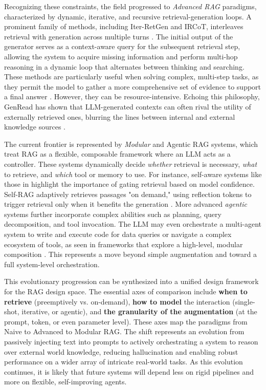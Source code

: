 \documentclass[11pt,a4paper]{article}
\begin{document}
Recognizing these constraints, the field progressed to \emph{Advanced RAG} paradigms, characterized by dynamic, iterative, and recursive retrieval-generation loops. A prominent family of methods, including Iter-RetGen and IRCoT, interleaves retrieval with generation across multiple turns \cite{arxiv:2305.15294v2}. The initial output of the generator serves as a context-aware query for the subsequent retrieval step, allowing the system to acquire missing information and perform multi-hop reasoning in a dynamic loop that alternates between thinking and searching. These methods are particularly useful when solving complex, multi-step tasks, as they permit the model to gather a more comprehensive set of evidence to support a final answer \cite{arxiv:2305.15294v2}. However, they can be resource-intensive. Echoing this philosophy, GenRead has shown that LLM-generated contexts can often rival the utility of externally retrieved ones, blurring the lines between internal and external knowledge sources \cite{arxiv:2209.10063v3}.

The current frontier is represented by \emph{Modular} and Agentic RAG systems, which treat RAG as a flexible, composable framework where an LLM acts as a controller. These systems dynamically decide \emph{whether} retrieval is necessary, \emph{what} to retrieve, and \emph{which} tool or memory to use. For instance, self-aware systems like those in \cite{arxiv:2212.10511v4} highlight the importance of gating retrieval based on model confidence. Self-RAG adaptively retrieves passages "on demand," using reflection tokens to trigger retrieval only when it benefits the generation \cite{arxiv:2310.11511v1}. More advanced \emph{agentic} systems further incorporate complex abilities such as planning, query decomposition, and tool invocation. The LLM may even orchestrate a multi-agent system to write and execute code for data queries or navigate a complex ecosystem of tools, as seen in frameworks that explore a high-level, modular composition \cite{arxiv:2308.07107v3}. This represents a move beyond simple augmentation and toward a full system-level orchestration.

This evolutionary progression can be synthesized into a unified design framework for the RAG design space. The essential axes of comparison include \textbf{when to retrieve} (preemptively vs. on-demand), \textbf{how to model} the interaction (single-shot, iterative, or agentic), and \textbf{the granularity of the augmentation} (at the prompt, token, or even parameter level). These axes map the paradigms from Naive to Advanced to Modular RAG. The shift represents an evolution from passively injecting text into prompts to actively orchestrating a system to reason over external world knowledge, reducing hallucination \cite{arxiv:2310.07521v3} and enabling robust performance on a wider array of intricate real-world tasks. As this evolution continues, it is likely that future systems will depend less on rigid pipelines and more on flexible, self-improving agents.
\end{document}
